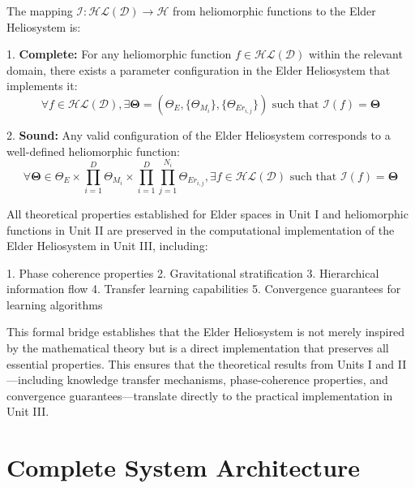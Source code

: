 \begin{theorem}
\label{thm:implementation_completeness}
The mapping $\mathcal{I}: \mathcal{HL}(\mathcal{D}) \rightarrow \mathcal{H}$ from heliomorphic functions to the Elder Heliosystem is:

1. \textbf{Complete:} For any heliomorphic function $f \in \mathcal{HL}(\mathcal{D})$ within the relevant domain, there exists a parameter configuration in the Elder Heliosystem that implements it:
\begin{equation}
\forall f \in \mathcal{HL}(\mathcal{D}), \exists \boldsymbol{\Theta} = (\Theta_E, \{\Theta_{M_i}\}, \{\Theta_{Er_{i,j}}\}) \text{ such that } \mathcal{I}(f) = \boldsymbol{\Theta}
\end{equation}

2. \textbf{Sound:} Any valid configuration of the Elder Heliosystem corresponds to a well-defined heliomorphic function:
\begin{equation}
\forall \boldsymbol{\Theta} \in \Theta_E \times \prod_{i=1}^D \Theta_{M_i} \times \prod_{i=1}^D \prod_{j=1}^{N_i} \Theta_{Er_{i,j}}, \exists f \in \mathcal{HL}(\mathcal{D}) \text{ such that } \mathcal{I}(f) = \boldsymbol{\Theta}
\end{equation}
\end{theorem}

\begin{corollary}
\label{cor:property_preservation}
All theoretical properties established for Elder spaces in Unit I and heliomorphic functions in Unit II are preserved in the computational implementation of the Elder Heliosystem in Unit III, including:

1. Phase coherence properties
2. Gravitational stratification
3. Hierarchical information flow
4. Transfer learning capabilities
5. Convergence guarantees for learning algorithms
\end{corollary}

This formal bridge establishes that the Elder Heliosystem is not merely inspired by the mathematical theory but is a direct implementation that preserves all essential properties. This ensures that the theoretical results from Units I and II—including knowledge transfer mechanisms, phase-coherence properties, and convergence guarantees—translate directly to the practical implementation in Unit III.

\section{Complete System Architecture}

